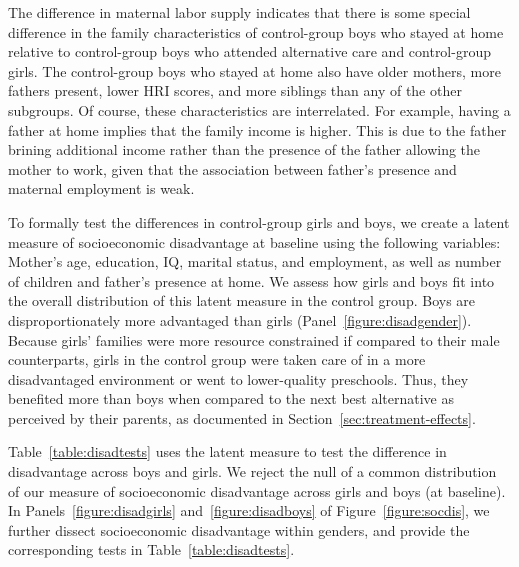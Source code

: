 The difference in maternal labor supply indicates that there is some special difference in the family characteristics of control-group boys who stayed at home relative to control-group boys who attended alternative care and control-group girls. The control-group boys who stayed at home also have older mothers, more fathers present, lower HRI scores, and more siblings than any of the other subgroups. Of course, these characteristics are interrelated. For example, having a father at home implies that the family income is higher. This is due to the father brining additional income rather than the presence of the father allowing the mother to work, given that the association between father's presence and maternal employment is weak. 

To formally test the differences in control-group girls and boys, we create a latent measure of socioeconomic disadvantage at baseline using the following variables: Mother's age, education, IQ, marital status, and employment, as well as number of children and father's presence at home. We assess how girls and boys fit into the overall distribution of this latent measure in the control group. Boys are disproportionately more advantaged than girls (Panel~\ref{figure:disadgender}). Because girls' families were more resource constrained if compared to their male counterparts, girls in the control group were taken care of in a more disadvantaged environment or went to lower-quality preschools. Thus, they benefited more than boys when compared to the next best alternative as perceived by their parents, as documented in Section~\ref{sec:treatment-effects}.

Table~\ref{table:disadtests} uses the latent measure to test the difference in disadvantage across boys and girls. We reject the null of a common distribution of our measure of socioeconomic disadvantage across girls and boys (at baseline). In Panels~\ref{figure:disadgirls} and~\ref{figure:disadboys} of Figure~\ref{figure:socdis}, we further dissect socioeconomic disadvantage within genders, and provide the corresponding tests in Table~\ref{table:disadtests}.

